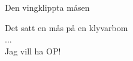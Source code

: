   {\Large Den vingklippta måsen}
  \begin{vers}
Det satt en mås på en klyvarbom \\
... \\
Jag vill ha OP! \\
\end{vers}